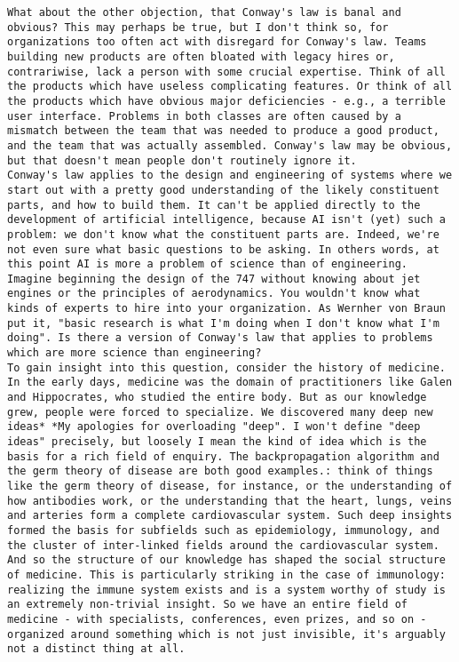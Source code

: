 \begin{lstlisting}
What about the other objection, that Conway's law is banal and obvious? This may perhaps be true, but I don't think so, for organizations too often act with disregard for Conway's law. Teams building new products are often bloated with legacy hires or, contrariwise, lack a person with some crucial expertise. Think of all the products which have useless complicating features. Or think of all the products which have obvious major deficiencies - e.g., a terrible user interface. Problems in both classes are often caused by a mismatch between the team that was needed to produce a good product, and the team that was actually assembled. Conway's law may be obvious, but that doesn't mean people don't routinely ignore it.
Conway's law applies to the design and engineering of systems where we start out with a pretty good understanding of the likely constituent parts, and how to build them. It can't be applied directly to the development of artificial intelligence, because AI isn't (yet) such a problem: we don't know what the constituent parts are. Indeed, we're not even sure what basic questions to be asking. In others words, at this point AI is more a problem of science than of engineering. Imagine beginning the design of the 747 without knowing about jet engines or the principles of aerodynamics. You wouldn't know what kinds of experts to hire into your organization. As Wernher von Braun put it, "basic research is what I'm doing when I don't know what I'm doing". Is there a version of Conway's law that applies to problems which are more science than engineering?
To gain insight into this question, consider the history of medicine. In the early days, medicine was the domain of practitioners like Galen and Hippocrates, who studied the entire body. But as our knowledge grew, people were forced to specialize. We discovered many deep new ideas* *My apologies for overloading "deep". I won't define "deep ideas" precisely, but loosely I mean the kind of idea which is the basis for a rich field of enquiry. The backpropagation algorithm and the germ theory of disease are both good examples.: think of things like the germ theory of disease, for instance, or the understanding of how antibodies work, or the understanding that the heart, lungs, veins and arteries form a complete cardiovascular system. Such deep insights formed the basis for subfields such as epidemiology, immunology, and the cluster of inter-linked fields around the cardiovascular system. And so the structure of our knowledge has shaped the social structure of medicine. This is particularly striking in the case of immunology: realizing the immune system exists and is a system worthy of study is an extremely non-trivial insight. So we have an entire field of medicine - with specialists, conferences, even prizes, and so on - organized around something which is not just invisible, it's arguably not a distinct thing at all.

\end{lstlisting}
